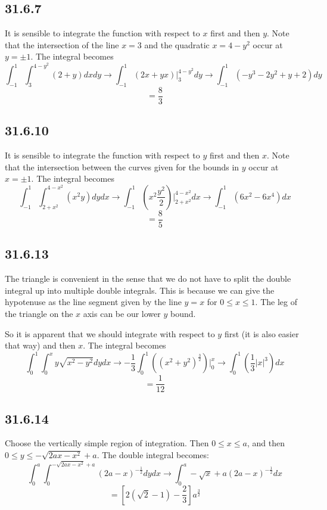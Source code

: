 \documentclass{article}
\begin{document}
\subsection{31.6.7}

It is sensible to integrate the function with respect to $x$ first and then $y$. Note that the intersection of the line $x = 3$ and the quadratic $x = 4-y^2$ occur at $y = \pm 1$. The integral becomes $$\int_{-1}^1\int_3^{4-y^2}(2+y)dxdy \to \int_{-1}^1 (2x+yx)\bigg|_3^{4-y^2}dy \to \int_{-1}^1 (-y^3-2y^2+y+2)dy$$
$$ = \frac{8}{3}$$

\subsection{31.6.10}

It is sensible to integrate the function with respect to $y$ first and then $x$. Note that the intersection between the curves given for the bounds in $y$ occur at $x = \pm 1$. The integral becomes $$\int_{-1}^1\int_{2+x^2}^{4-x^2}(x^2y)dydx \to \int_{-1}^1 (x^2\frac{y^2}{2})\bigg|_{2+x^2}^{4-x^2}dx\to \int_{-1}^1 (6 x^2 - 6 x^4)dx$$
$$ = \frac{8}{5}$$

\subsection{31.6.13}

The triangle is convenient in the sense that we do not have to split the double integral up into multiple double integrals. This is because we can give the hypotenuse as the line segment given by the line $y = x$ for $0\leq x \leq 1$. The leg of the triangle on the $x$ axis can be our lower $y$ bound.

So it is apparent that we should integrate with respect to $y$ first (it is also easier that way) and then $x$. The integral becomes $$\int_0^1\int_{0}^{x}y\sqrt{x^2-y^2}dydx \to -\frac{1}{3}\int_0^1((x^2+y^2)^{\frac{3}{2}})\bigg|_{0}^{x}\to \int_0^1 \left(\frac{1}{3} |x|^3\right)dx$$
$$ = \frac{1}{12}$$

\subsection{31.6.14}

Choose the vertically simple region of integration. Then $0\leq x \leq a$, and then $0\leq y \leq -\sqrt{2ax-x^{2}}+a$. The double integral becomes:
$$\int_{0}^{a}\int_{0}^{-\sqrt{2ax-x^{2}}+a} (2a-x)^{-\frac{1}{2}}dydx \to \int_0^a -\sqrt{x} + a(2a-x)^{-\frac{1}{2}}dx$$
$$= \left[2\left(\sqrt{2}-1\right)-\frac{2}{3}\right]a^{\frac{3}{2}}$$
\end{document}
